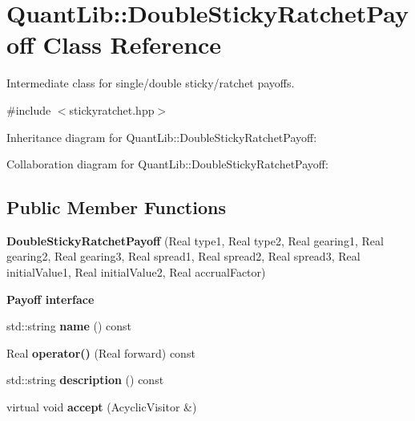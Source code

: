 \section{Quant\+Lib\+:\+:Double\+Sticky\+Ratchet\+Payoff Class Reference}
\label{class_quant_lib_1_1_double_sticky_ratchet_payoff}


Intermediate class for single/double sticky/ratchet payoffs.  




{\ttfamily \#include $<$stickyratchet.\+hpp$>$}



Inheritance diagram for Quant\+Lib\+:\+:Double\+Sticky\+Ratchet\+Payoff\+:


Collaboration diagram for Quant\+Lib\+:\+:Double\+Sticky\+Ratchet\+Payoff\+:
\subsection*{Public Member Functions}
\begin{DoxyCompactItemize}
\item 
{\bfseries Double\+Sticky\+Ratchet\+Payoff} (Real type1, Real type2, Real gearing1, Real gearing2, Real gearing3, Real spread1, Real spread2, Real spread3, Real initial\+Value1, Real initial\+Value2, Real accrual\+Factor)\label{class_quant_lib_1_1_double_sticky_ratchet_payoff_ae48267f27281f7991d591208e7d68e00}

\end{DoxyCompactItemize}
\begin{Indent}{\bf Payoff interface}\par
\begin{DoxyCompactItemize}
\item 
std\+::string {\bfseries name} () const \label{class_quant_lib_1_1_double_sticky_ratchet_payoff_a4b9fc4d3cf12265ca6bf9f57d9507061}

\item 
Real {\bfseries operator()} (Real forward) const \label{class_quant_lib_1_1_double_sticky_ratchet_payoff_aa12205230ffa45e710cb7633b3bc7f35}

\item 
std\+::string {\bfseries description} () const \label{class_quant_lib_1_1_double_sticky_ratchet_payoff_a68c7b054083230ff8b6deba65239c840}

\item 
virtual void {\bfseries accept} (Acyclic\+Visitor \&)\label{class_quant_lib_1_1_double_sticky_ratchet_payoff_a2582ddfeb19a0a6feae5829262c7201e}

\end{DoxyCompactItemize}
\end{Indent}
